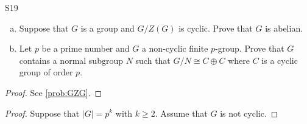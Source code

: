 \documentclass[../AlgebraQualSolutions.tex]{subfiles}
\begin{document}
	\begin{prob}{S19}{}
	\begin{enumerate}[(a)]
	\item Suppose that $G$ is a group and $G/Z(G)$ is cyclic. Prove  that $G$ is abelian.
	\item Let $p$ be a prime number and $G$ a non-cyclic finite $p$-group. Prove that $G$ contains a normal subgroup $N$ such that $G/N \cong C \oplus C$ where $C$ is a cyclic group of order $p$.
	\end{enumerate}
	\end{prob}
	
	\begin{proof}
	See \ref{prob:GZG}.
	\end{proof}
	
	\begin{proof}
	Suppose that $|G| = p^k$ with $k \geq 2$. Assume that $G$ is not cyclic.
	\end{proof}
	
\end{document}

